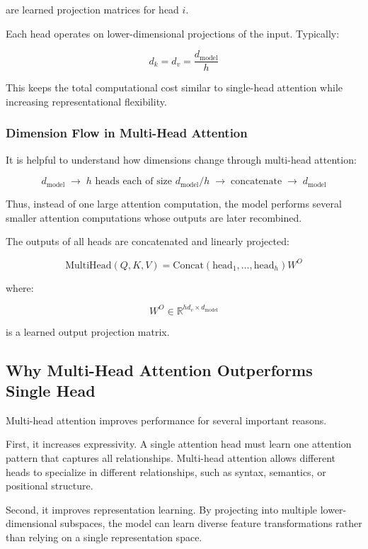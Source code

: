\documentclass[11pt]{article}
\begin{document}
are learned projection matrices for head $i$.

Each head operates on lower-dimensional projections of the input. Typically:

\[
d_k = d_v = \frac{d_{\text{model}}}{h}
\]

This keeps the total computational cost similar to single-head attention while increasing representational flexibility.

\subsubsection{Dimension Flow in Multi-Head Attention}

It is helpful to understand how dimensions change through multi-head attention:

\[
d_{\text{model}}
\;\rightarrow\;
h \text{ heads each of size } d_{\text{model}}/h
\;\rightarrow\;
\text{concatenate}
\;\rightarrow\;
d_{\text{model}}
\]

Thus, instead of one large attention computation, the model performs several smaller attention computations whose outputs are later recombined.

The outputs of all heads are concatenated and linearly projected:

\[
\text{MultiHead}(Q,K,V)
=
\text{Concat}
(
\text{head}_1,
\ldots,
\text{head}_h
)
W^O
\]

where:

\[
W^O \in \mathbb{R}^{h d_v \times d_{\text{model}}}
\]

is a learned output projection matrix.

\subsection{Why Multi-Head Attention Outperforms Single Head}

Multi-head attention improves performance for several important reasons.

First, it increases expressivity. A single attention head must learn one attention pattern that captures all relationships. Multi-head attention allows different heads to specialize in different relationships, such as syntax, semantics, or positional structure.

Second, it improves representation learning. By projecting into multiple lower-dimensional subspaces, the model can learn diverse feature transformations rather than relying on a single representation space.
\end{document}
